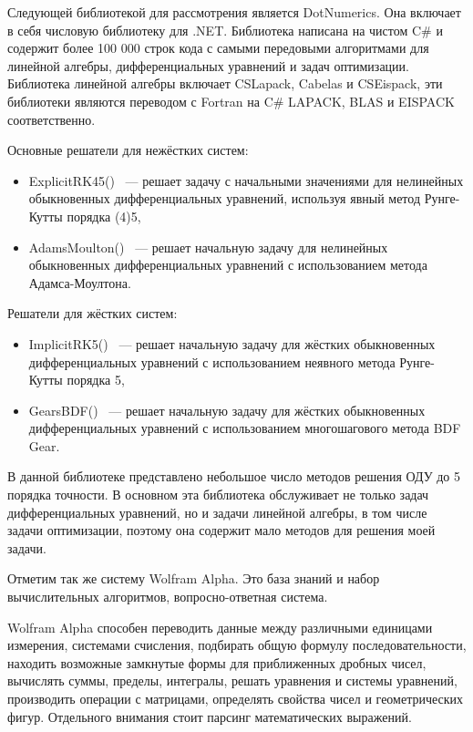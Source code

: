 Следующей библиотекой для рассмотрения является DotNumerics. Она включает в себя числовую библиотеку для .NET. Библиотека написана на
чистом C\# и содержит более 100 000 строк кода с
самыми передовыми алгоритмами для линейной алгебры, дифференциальных уравнений и задач оптимизации. Библиотека линейной алгебры
включает CSLapack, Cabelas и CSEispack, эти библиотеки являются переводом с Fortran на C\# LAPACK, BLAS и EISPACK соответственно.

Основные решатели для нежёстких систем:
\begin{itemize}
    \item ExplicitRK45() ~--- решает задачу с начальными значениями для нелинейных обыкновенных дифференциальных уравнений, используя
        явный метод Рунге-Кутты порядка (4)5,
    \item AdamsMoulton() ~--- решает начальную задачу для нелинейных обыкновенных дифференциальных уравнений с использованием метода
        Адамса-Моултона.
\end{itemize}

Решатели для жёстких систем:
\begin{itemize}
    \item ImplicitRK5() ~--- решает начальную задачу для жёстких обыкновенных дифференциальных уравнений с использованием неявного
        метода Рунге-Кутты порядка 5,
    \item GearsBDF() ~--- решает начальную задачу для жёстких обыкновенных дифференциальных уравнений с использованием многошагового
        метода BDF Gear.
\end{itemize}

В данной библиотеке представлено небольшое число методов решения ОДУ до 5 порядка точности. В основном эта библиотека обслуживает
не только задач дифференциальных уравнений, но и задачи линейной алгебры, в том числе задачи оптимизации, поэтому она содержит мало методов
для решения моей задачи.

Отметим так же систему Wolfram Alpha. Это база знаний и набор вычислительных алгоритмов, вопросно-ответная
система.

Wolfram Alpha способен переводить данные между различными единицами
измерения, системами счисления, подбирать общую формулу последовательности, находить возможные замкнутые формы для приближенных
дробных чисел, вычислять суммы, пределы, интегралы, решать уравнения и системы уравнений, производить операции с матрицами, определять
свойства чисел и геометрических фигур. Отдельного внимания стоит парсинг математических выражений.

